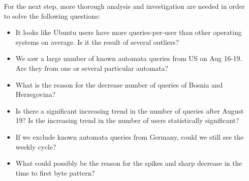 \documentclass[12pt,]{article}
\providecommand{\tightlist}{%
  \setlength{\itemsep}{0pt}\setlength{\parskip}{0pt}}
\begin{document}
For the next step, more thorough analysis and investigation are needed
in order to solve the following questions:

\begin{itemize}
\tightlist
\item
  It looks like Ubuntu users have more queries-per-user than other
  operating systems on average. Is it the result of several outliers?
\item
  We saw a large number of known automata queries from US on Aug 16-19. Are
  they from one or several particular automata?
\item
  What is the reason for the decrease number of queries of Bosnia and
  Herzegovina?
\item
  Is there a significant increasing trend in the number of queries after
  August 19? Is the increasing trend in the number of users
  statistically significant?
\item
  If we exclude known automata queries from Germany, could we still see
  the weekly cycle?
\item
  What could possibly be the reason for the spikes and sharp decrease in
  the time to first byte pattern?
\end{itemize}
\end{document}
